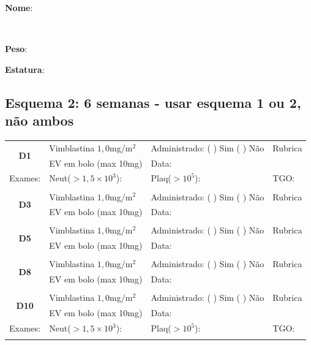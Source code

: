 \documentclass[11pt,a4paper,oldfontcommands]{memoir}
\def\entrywithlabel[#1]#2{\parbox{#1}{{\small #2:} \hrulefill}}
\begin{document}
\begin{center}
\pagebreak
\noindent
\entrywithlabel[1\hsize]{\textbf{Nome}}\hfill
\\[0.3cm]
\entrywithlabel[.45\hsize]{\textbf{Peso}}\hfill  \entrywithlabel[.45\hsize]{\textbf{Estatura}}
\end{center}
\subsection{Esquema 2: 6 semanas - usar esquema 1 ou 2, não ambos}
\begin{center}
\begin{table}[H]
\begin{tabular}{p{1.3cm}p{5cm}|p{5cm}|p{3cm}}
    \hline
    \multicolumn{1}{c|}{\multirow{2}{*}{\textbf{D1}}}&{Vimblastina \(1,0\)mg/m\(^2\)}&{Administrado: (  ) Sim (  ) Não}&{Rubrica}\\
    \multicolumn{1}{c|}{}&{EV em bolo (max 10mg)}&{Data:}&\\
    \hline
    {Exames:}&{Neut(\(>1,5\times10^3\)):}&{Plaq(\(>10^5\)):}&{TGO:}
    \\
    \hline
    \\
    \hline
    \multicolumn{1}{c|}{\multirow{2}{*}{\textbf{D3}}}&{Vimblastina \(1,0\)mg/m\(^2\)}&{Administrado: (  ) Sim (  ) Não}&{Rubrica}\\
    \multicolumn{1}{c|}{}&{EV em bolo (max 10mg)}&{Data:}&\\
    \hline
    \\
    \hline
    \multicolumn{1}{c|}{\multirow{2}{*}{\textbf{D5}}}&{Vimblastina \(1,0\)mg/m\(^2\)}&{Administrado: (  ) Sim (  ) Não}&{Rubrica}\\
    \multicolumn{1}{c|}{}&{EV em bolo (max 10mg)}&{Data:}&\\
    \hline
    \\
    \hline
    \multicolumn{1}{c|}{\multirow{2}{*}{\textbf{D8}}}&{Vimblastina \(1,0\)mg/m\(^2\)}&{Administrado: (  ) Sim (  ) Não}&{Rubrica}\\
    \multicolumn{1}{c|}{}&{EV em bolo (max 10mg)}&{Data:}&\\
    \hline
    \\
    \hline
    \multicolumn{1}{c|}{\multirow{2}{*}{\textbf{D10}}}&{Vimblastina \(1,0\)mg/m\(^2\)}&{Administrado: (  ) Sim (  ) Não}&{Rubrica}\\
    \multicolumn{1}{c|}{}&{EV em bolo (max 10mg)}&{Data:}&\\
    \hline
    {Exames:}&{Neut(\(>1,5\times10^3\)):}&{Plaq(\(>10^5\)):}&{TGO:}
    \\
    \hline\\

\end{tabular}
\end{table}
\end{center}
\end{document}
